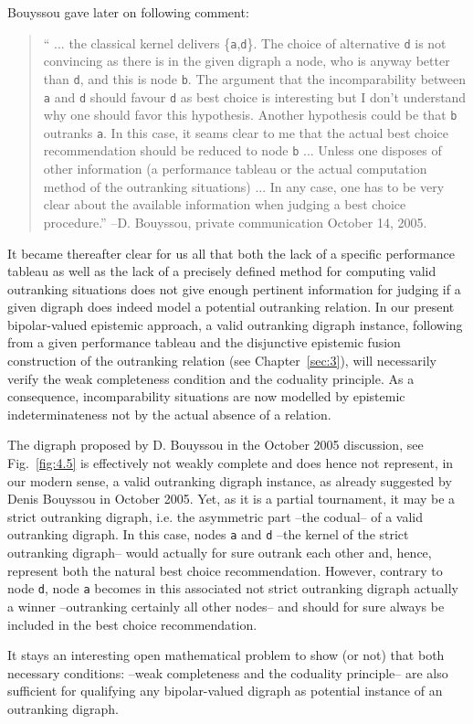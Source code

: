 \noindent Bouyssou gave later on following comment:
\begin{quotation}
`` ... the classical kernel delivers \{\texttt{a},\texttt{d}\}. The choice of alternative \texttt{d} is not convincing as there is in the given digraph a node, who is anyway better than \texttt{d}, and this is node \texttt{b}. The argument that the incomparability between \texttt{a} and \texttt{d} should favour \texttt{d} as best choice is interesting but I don't understand why one should favor this hypothesis. Another hypothesis could be that \texttt{b} outranks \texttt{a}. In this case, it seams clear to me that the actual best choice recommendation should be reduced to node \texttt{b} ... Unless one disposes of other information (a performance tableau or the actual computation method of the outranking situations) ... In any case, one has to be very clear about the available information when judging a best choice procedure.'' --D. Bouyssou, private communication October 14, 2005.
\end{quotation}
It became thereafter clear for us all that both the lack of a specific performance tableau as well as the lack of a precisely defined method for computing valid outranking situations does not give enough pertinent information for judging if a given digraph does indeed model a potential outranking relation. In our present bipolar-valued epistemic approach, a valid outranking digraph instance, following from a given performance tableau and the disjunctive epistemic fusion construction of the outranking relation (see Chapter~\ref{sec:3}), will necessarily verify the weak completeness condition and the coduality principle. As a consequence, incomparability situations are now modelled by epistemic indeterminateness not by the actual absence of a relation.

The digraph proposed by D. Bouyssou in the October 2005 discussion, see Fig.~\ref{fig:4.5} is effectively not weakly complete and does hence not represent, in our modern sense, a valid outranking digraph instance, as already suggested by Denis Bouyssou in October 2005. Yet, as it is a partial tournament, it may be a strict outranking digraph, i.e. the asymmetric part --the codual-- of a valid outranking digraph. In this case, nodes \texttt{a} and \texttt{d} --the kernel of the strict outranking digraph-- would actually for sure outrank each other and, hence, represent both the natural best choice recommendation. However, contrary to node \texttt{d}, node \texttt{a} becomes in this associated not strict outranking digraph actually a \Condorcet winner --outranking certainly all other nodes-- and should for sure always be included in the best choice recommendation.

It stays an interesting open mathematical problem to show (or not) that both necessary conditions: --weak completeness and the coduality principle-- are also sufficient for qualifying any bipolar-valued digraph as potential instance of an outranking digraph.


\clearpage


%
